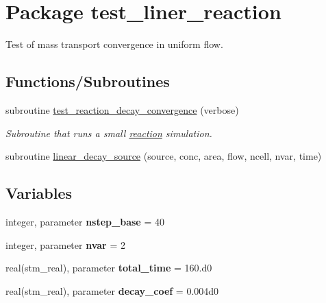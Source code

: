 \hypertarget{a00090}{
\section{Package test\_\-liner\_\-reaction}
\label{a00090}
}
Test of mass transport convergence in uniform flow.  


\subsection*{Functions/Subroutines}
\begin{CompactItemize}
\item 
\hypertarget{a00090_cd325397f8ef1373766626c9bcb76af8}{
subroutine \hyperlink{a00090_cd325397f8ef1373766626c9bcb76af8}{test\_\-reaction\_\-decay\_\-convergence} (verbose)}
\label{a00090_cd325397f8ef1373766626c9bcb76af8}

\begin{CompactList}\small\item\em Subroutine that runs a small \hyperlink{a00068}{reaction} simulation. \item\end{CompactList}\item 
subroutine \hyperlink{a00090_ca5e60e57bdca174389beb43b8bc5db7}{linear\_\-decay\_\-source} (source, conc, area, flow, ncell, nvar, time)
\end{CompactItemize}
\subsection*{Variables}
\begin{CompactItemize}
\item 
\hypertarget{a00090_476c4d9f665f09ebb571fe1f1d41cddc}{
integer, parameter \textbf{nstep\_\-base} = 40}
\label{a00090_476c4d9f665f09ebb571fe1f1d41cddc}

\item 
\hypertarget{a00090_71f7abddf3fc1507115af11d8836f3c2}{
integer, parameter \textbf{nvar} = 2}
\label{a00090_71f7abddf3fc1507115af11d8836f3c2}

\item 
\hypertarget{a00090_871af4398e8f123cafa86413f7fc6deb}{
real(stm\_\-real), parameter \textbf{total\_\-time} = 160.d0}
\label{a00090_871af4398e8f123cafa86413f7fc6deb}

\item 
\hypertarget{a00090_bcc69fd5405de5bade24207ff257f786}{
real(stm\_\-real), parameter \textbf{decay\_\-coef} = 0.004d0}
\label{a00090_bcc69fd5405de5bade24207ff257f786}

\end{CompactItemize}


